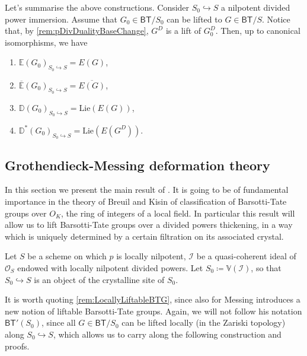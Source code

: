 \begin{rem}[]
	Let's summarise the above constructions.
	Consider $S_0 \hookrightarrow S$ a nilpotent divided power immersion.
	Assume that $G_0 \in \mathsf{BT}/S_0$ can be lifted to $G \in \mathsf{BT}/S$.
	Notice that, by \cref{rem:pDivDualityBaseChange}, $G^D$ is a lift of $G_0^D$.
	Then, up to canonical isomorphisms, we have
\begin{enumerate}
	\item $\mathbb{E}(G_0)_{S_0 \hookrightarrow S} = E(G)$,
	\item $\overline{\mathbb{E}}(G_0)_{S_0 \hookrightarrow S} = \overline{E(G)}$,
	\item $\mathbb{D}(G_0)_{S_0 \hookrightarrow S} = 
		\mathrm{Lie}(E(G))$,
	\item $\mathbb{D}^*(G_0)_{S_0 \hookrightarrow S} = \mathrm{Lie}(E(G^D))$.
\end{enumerate}
\end{rem}



\subsection{Grothendieck-Messing deformation theory}
In this section we present the main result of \cite[Chapter V]{Messing}.
It is going to be of fundamental importance in the theory of Breuil and Kisin of
classification of Barsotti-Tate groups over $O_K$, the ring of integers
of a local field.
In particular this result will allow us to lift Barsotti-Tate groups 
over a divided powers thickening, in a way which is uniquely determined by
a certain filtration on its associated crystal.


\begin{ntt}
	Let $S$ be a scheme on which $p$ is locally nilpotent, $\mathcal{I}$
	be a quasi-coherent ideal of $\mathcal{O}_{ S }$ endowed with locally nilpotent
	divided powers.
	Let $S_0 \coloneqq \mathbb{V}(\mathcal{I})$,
	so that $S_0 \hookrightarrow S$ is an object of the crystalline site of $S_0$.
\end{ntt} 


\begin{rem}[]
	It is worth quoting \cref{rem:LocallyLiftableBTG},
	since also for \cite[Chapter V]{Messing} Messing
	introduces a new notion of liftable Barsotti-Tate groups.
	Again, we will not follow his notation $\mathsf{BT}'(S_0)$,
	since all $G \in \mathsf{BT}/S_0$ can be lifted locally
	(in the Zariski topology) along $S_0 \hookrightarrow S$,
	which allows us to carry along the following construction
	and proofs.
\end{rem}


